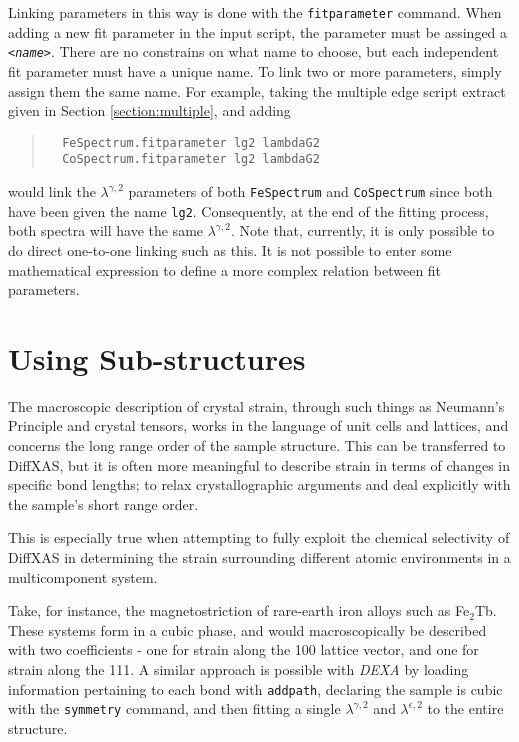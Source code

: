 \documentclass[a4paper,12pt]{report}
\newcommand{\dexa}{\emph{DEXA} }
\begin{document}
Linking parameters in this way is done with the \verb|fitparameter| command. When adding a new fit parameter in the input script, the parameter must be assinged a \emph{\texttt{<name>}}. There are no constrains on what name to choose, but each independent fit parameter must have a unique name. To link two or more parameters, simply assign them the same name. For example, taking the multiple edge script extract given in Section \ref{section:multiple}, and adding
\begin{quote}
  \begin{verbatim}
  FeSpectrum.fitparameter lg2 lambdaG2
  CoSpectrum.fitparameter lg2 lambdaG2
  \end{verbatim}
\end{quote}
would link the $\lambda^{\gamma,2}$ parameters of both \verb|FeSpectrum| and \verb|CoSpectrum| since both have been given the name \verb|lg2|. Consequently, at the end of the fitting process, both spectra will have the same $\lambda^{\gamma,2}$. Note that, currently, it is only possible to do direct one-to-one linking such as this. It is not possible to enter some mathematical expression to define a more complex relation between fit parameters.




\section{Using Sub-structures}
\label{section:substructures}
The macroscopic description of crystal strain, through such things as Neumann's Principle and crystal tensors, works in the language of unit cells and lattices, and concerns the long range order of the sample structure. This can be transferred to DiffXAS, but it is often more meaningful to describe strain in terms of changes in specific bond lengths; to relax crystallographic arguments and deal explicitly with the sample's short range order.

This is especially true when attempting to fully exploit the chemical selectivity of DiffXAS in determining the strain surrounding different atomic environments in a multicomponent system. 

Take, for instance, the magnetostriction of rare-earth iron alloys such as Fe$_2$Tb. These systems form in a cubic phase, and would macroscopically be described with two coefficients - one for strain along the 100 lattice vector, and one for strain along the 111. A similar approach is possible with \dexa by loading information pertaining to each bond with \verb|addpath|, declaring the sample is cubic with the \verb|symmetry| command, and then fitting a single $\lambda^{\gamma,2}$ and $\lambda^{\epsilon,2}$ to the entire structure.
\end{document}
